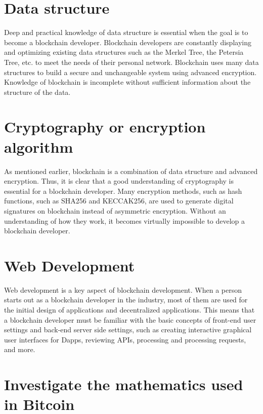 \begin{flushleft}
\section{Data structure}

Deep and practical knowledge of data structure is essential when the goal is to become a blockchain developer. Blockchain developers are constantly displaying and optimizing existing data structures such as the Merkel Tree, the Petersia Tree, etc. to meet the needs of their personal network. Blockchain uses many data structures to build a secure and unchangeable system using advanced encryption. Knowledge of blockchain is incomplete without sufficient information about the structure of the data.

\section{Cryptography or encryption algorithm}

As mentioned earlier, blockchain is a combination of data structure and advanced encryption. Thus, it is clear that a good understanding of cryptography is essential for a blockchain developer. Many encryption methods, such as hash functions, such as SHA256 and KECCAK256, are used to generate digital signatures on blockchain instead of asymmetric encryption. Without an understanding of how they work, it becomes virtually impossible to develop a blockchain developer.

\section{Web Development}

Web development is a key aspect of blockchain development. When a person starts out as a blockchain developer in the industry, most of them are used for the initial design of applications and decentralized applications. This means that a blockchain developer must be familiar with the basic concepts of front-end user settings and back-end server side settings, such as creating interactive graphical user interfaces for Dapps, reviewing APIs, processing and processing requests, and more.

\section{Investigate the mathematics used in Bitcoin}


\end{flushleft}
